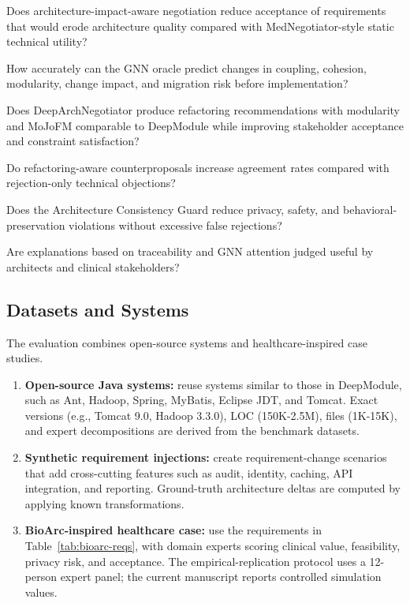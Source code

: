 \documentclass[english,preprint,nonatbib]{elsarticle}
\begin{document}
\begin{description}[leftmargin=2.5em]
  \item[RQ1:] Does architecture-impact-aware negotiation reduce acceptance of requirements that would erode architecture quality compared with MedNegotiator-style static technical utility?
  \item[RQ2:] How accurately can the GNN oracle predict changes in coupling, cohesion, modularity, change impact, and migration risk before implementation?
  \item[RQ3:] Does DeepArchNegotiator produce refactoring recommendations with modularity and MoJoFM comparable to DeepModule while improving stakeholder acceptance and constraint satisfaction?
  \item[RQ4:] Do refactoring-aware counterproposals increase agreement rates compared with rejection-only technical objections?
  \item[RQ5:] Does the Architecture Consistency Guard reduce privacy, safety, and behavioral-preservation violations without excessive false rejections?
  \item[RQ6:] Are explanations based on traceability and GNN attention judged useful by architects and clinical stakeholders?
\end{description}

\subsection{Datasets and Systems}

The evaluation combines open-source systems and healthcare-inspired case studies.

\begin{enumerate}[leftmargin=2em]
  \item \textbf{Open-source Java systems:} reuse systems similar to those in DeepModule, such as Ant, Hadoop, Spring, MyBatis, Eclipse JDT, and Tomcat.
Exact versions (e.g., Tomcat 9.0, Hadoop 3.3.0), LOC (150K-2.5M), files (1K-15K), and expert decompositions are derived from the benchmark datasets.
  \item \textbf{Synthetic requirement injections:} create requirement-change scenarios that add cross-cutting features such as audit, identity, caching, API integration, and reporting.
Ground-truth architecture deltas are computed by applying known transformations.
  \item \textbf{BioArc-inspired healthcare case:} use the requirements in Table~\ref{tab:bioarc-reqs}, with domain experts scoring clinical value, feasibility, privacy risk, and acceptance.
The empirical-replication protocol uses a 12-person expert panel; the current manuscript reports controlled simulation values.
\end{enumerate}
\end{document}

